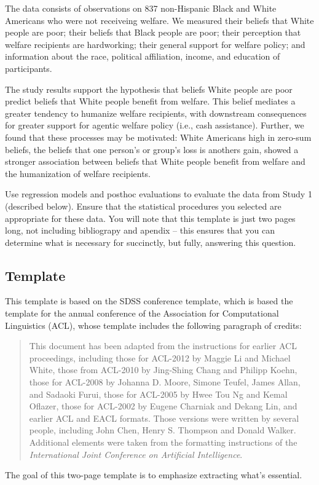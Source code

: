 \documentclass{article}\usepackage[]{graphicx}\usepackage[]{color}
\begin{document}
\begin{multicols}{2}
The data consists of observations on 837 non-Hispanic Black and White Americans who were not receiveing welfare. We measured their beliefs that White people are poor; their beliefs that Black people are poor; their perception that welfare recipients are hardworking; their general support for welfare policy; and information about the race, political affiliation, income, and education of participants.

The study results support the hypothesis that beliefs White people are poor predict beliefs that White people benefit from welfare. This belief mediates a greater tendency to humanize welfare recipients, with downstream consequences for greater support for agentic welfare policy (i.e., cash assistance). Further, we found that these processes may be motivated: White Americans high in zero-sum beliefs, the beliefs that one person's or group's loss is anothers gain, showed a stronger association between beliefs that White people benefit from welfare and the humanization of welfare recipients.

Use regression models and posthoc evaluations to evaluate the data from Study 1 (described below). Ensure that the statistical procedures you selected are appropriate for these data. You will note that this template is just two pages long, not including bibliograpy and apendix -- this ensures that you can determine what is necessary for succinctly, but fully, answering this question. 

\subsection{Template}
This template is based on the SDSS conference template, which is based the template for the annual conference of the Association for Computational Linguistics (ACL), whose template includes the following paragraph of credits:
\begin{quotation}
\small %
This document has been adapted from the instructions for earlier ACL proceedings, including those for ACL-2012 by Maggie Li and Michael White, those from ACL-2010 by Jing-Shing Chang and Philipp Koehn, those for ACL-2008 by Johanna D. Moore, Simone Teufel, James Allan, and Sadaoki Furui, those for ACL-2005 by Hwee Tou Ng and Kemal Oflazer, those for ACL-2002 by Eugene Charniak and Dekang Lin, and earlier ACL and EACL formats. Those versions were written by several people, including John Chen, Henry S. Thompson and Donald Walker. Additional elements were taken from the formatting instructions of the {\em International Joint Conference on Artificial Intelligence}.
\end{quotation}  
The goal of this two-page template is to emphasize extracting what's essential.


\end{multicols}
\end{document}
